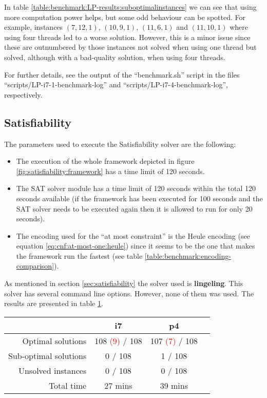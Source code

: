 In table \ref{table:benchmark:LP-results:suboptimalinstances} we can see that using more
computation power helps, but some odd behaviour can be spotted. For example,
instances $(7,12,1)$, $(10,9,1)$, $(11,6,1)$ and $(11,10,1)$  where using four
threads led to a worse solution. However, this is a minor issue since these are
outnumbered by those instances not solved when using one thread but solved,
although with a bad-quality solution, when using four threads.

\hfill

For further details, see the output of the ``benchmark.sh'' script in the files
``scripts/LP-i7-1-benchmark-log'' and ``scripts/LP-i7-4-benchmark-log'', respectively.

\subsection{Satisfiability}
\label{sec:benchmarking:satisfiability}

The parameters used to execute the Satisfiability solver are the following:
\begin{itemize}
	\item The execution of the whole framework depicted in figure \ref{fig:satisfiability:framework}
	has a time limit of 120 seconds.
	\item The SAT solver module has a time limit of 120 seconds within the total 120 seconds
	available (if the framework has been executed for 100 seconds and the SAT solver needs
	to be executed again then it is allowed to run for only 20 seconds).
	\item The encoding used for the ``at most constraint'' is the Heule encoding 
	(see equation \ref{eq:cnf:at-most-one:heule}) since it seems to be the one that makes the framework
	run the fastest (see table \ref{table:benchmark:encoding-comparison}).
\end{itemize}

As mentioned in section \ref{sec:satisfiability} the solver used is \textbf{lingeling}\cite{lingeling}.
This solver has several command line options. However, none of them was used. The results
are presented in table \ref{table:benchmark:SAT-results}.

\begin{table}[H]
\centering
	\begin{tabular}{rccc}
								& i7 	& p4 \\
		\midrule
		Optimal solutions		& 108 \textcolor{red}{(9)} / 108
											& 107 \textcolor{red}{(7)} / 108 \\
		Sub-optimal solutions	& 0 / 108	& 1 / 108 \\
		Unsolved instances		& 0 / 108	& 0 / 108 \\
		Total time				& 27 mins	& 39 mins \\
	\end{tabular}
	\label{table:benchmark:SAT-results}
\end{table}

